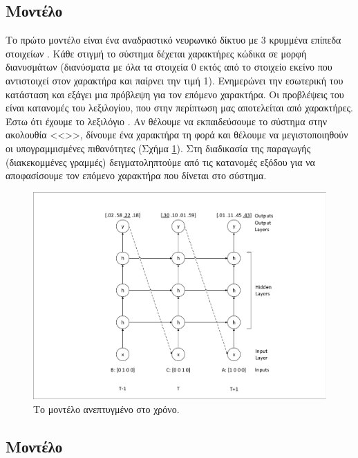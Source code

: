 \subsection{Μοντέλο }

Το πρώτο μοντέλο είναι ένα αναδραστικό νευρωνικό δίκτυο με 3 κρυμμένα επίπεδα στοιχείων .
Κάθε στιγμή το σύστημα δέχεται χαρακτήρες κώδικα σε μορφή διανυσμάτων   (διανύσματα με όλα τα στοιχεία 0 εκτός από το στοιχείο εκείνο που αντιστοιχεί στον χαρακτήρα και παίρνει την τιμή 1).
Ενημερώνει την εσωτερική του κατάσταση και εξάγει μια πρόβλεψη για τον επόμενο χαρακτήρα.
Οι προβλέψεις του  είναι κατανομές του λεξιλογίου, που στην περίπτωση μας αποτελείται από χαρακτήρες.
Έστω ότι έχουμε το λεξιλόγιο .
Αν θέλουμε να εκπαιδεύσουμε το σύστημα στην ακολουθία <<>>, δίνουμε ένα χαρακτήρα τη φορά και θέλουμε να μεγιστοποιηθούν οι υπογραμμισμένες πιθανότητες (Σχήμα \ref{fig:char-rnn}). Στη διαδικασία της παραγωγής (διακεκομμένες γραμμές) δειγματοληπτούμε από τις κατανομές εξόδου για να αποφασίσουμε τον επόμενο χαρακτήρα που δίνεται στο σύστημα. 


\begin{figure}[h]
	\includegraphics[width=\textwidth, trim = 4 4 4 4, clip, keepaspectratio]{images/char-rnn.pdf}
	\centering 
	\caption{Το μοντέλο  ανεπτυγμένο στο χρόνο.}
	\label{fig:char-rnn}
\end{figure}

\subsection{Μοντέλο }

